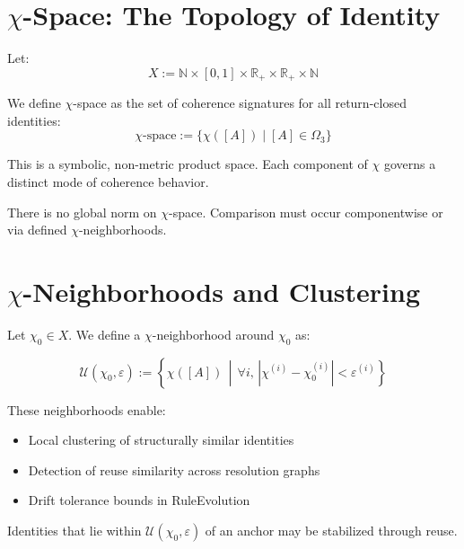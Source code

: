 \section{$\chi$-Space: The Topology of Identity} \label{chi-space-the-topology-of-identity}

Let:
\[
X := \mathbb{N} \times [0,1] \times \mathbb{R}_+ \times \mathbb{R}_+ \times \mathbb{N}
\]

\begin{definition} \label{def:chi-space}
We define $\chi$-space as the set of coherence signatures for all return-closed identities:
\begin{equation} \label{eq:chi-space}
\chi\text{-space} := \{ \chi([A]) \mid [A] \in \Omega_3 \}
\end{equation}
\end{definition}

This is a symbolic, non-metric product space.  
Each component of $\chi$ governs a distinct mode of coherence behavior.

There is no global norm on $\chi$-space.  
Comparison must occur componentwise or via defined $\chi$-neighborhoods.

\section{$\chi$-Neighborhoods and Clustering} \label{chi-neighborhoods-and-clustering}

Let $\chi_0 \in X$.  
We define a $\chi$-neighborhood around $\chi_0$ as:

\begin{definition} \label{def:chi-neighborhood}
\begin{equation} \label{eq:chi-neighborhood}
\mathcal{U}(\chi_0, \varepsilon) := \left\{ \chi([A]) \,\middle|\, \forall i,\, \left| \chi^{(i)} - \chi_0^{(i)} \right| < \varepsilon^{(i)} \right\}
\end{equation}
\end{definition}

These neighborhoods enable:
\begin{itemize}
  \item Local clustering of structurally similar identities
  \item Detection of reuse similarity across resolution graphs
  \item Drift tolerance bounds in RuleEvolution
\end{itemize}

Identities that lie within $\mathcal{U}(\chi_0, \varepsilon)$ of an anchor may be stabilized through reuse.

